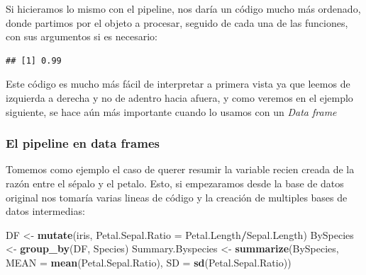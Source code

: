 \documentclass[]{book}
\newenvironment{Shaded}{\begin{snugshade}}{\end{snugshade}}
\newcommand{\DataTypeTok}[1]{\textcolor[rgb]{0.13,0.29,0.53}{#1}}
\newcommand{\DecValTok}[1]{\textcolor[rgb]{0.00,0.00,0.81}{#1}}
\newcommand{\KeywordTok}[1]{\textcolor[rgb]{0.13,0.29,0.53}{\textbf{#1}}}
\newcommand{\NormalTok}[1]{#1}
\newcommand{\OperatorTok}[1]{\textcolor[rgb]{0.81,0.36,0.00}{\textbf{#1}}}
\newcommand{\StringTok}[1]{\textcolor[rgb]{0.31,0.60,0.02}{#1}}
\begin{document}
Si hicieramos lo mismo con el pipeline, nos daría un código mucho más
ordenado, donde partimos por el objeto a procesar, seguido de cada una
de las funciones, con sus argumentos si es necesario:

\begin{Shaded}
\end{Shaded}

\begin{verbatim}
## [1] 0.99
\end{verbatim}

Este código es mucho más fácil de interpretar a primera vista ya que
leemos de izquierda a derecha y no de adentro hacia afuera, y como
veremos en el ejemplo siguiente, se hace aún más importante cuando lo
usamos con un \emph{Data frame}

\hypertarget{el-pipeline-en-data-frames}{%
\subsubsection{El pipeline en data
frames}\label{el-pipeline-en-data-frames}}

Tomemos como ejemplo el caso de querer resumir la variable recien creada
de la razón entre el sépalo y el petalo. Esto, si empezaramos desde la
base de datos original nos tomaría varias lineas de código y la creación
de multiples bases de datos intermedias:

\begin{Shaded}
\begin{Highlighting}[]
\NormalTok{DF <-}\StringTok{ }\KeywordTok{mutate}\NormalTok{(iris, }\DataTypeTok{Petal.Sepal.Ratio =}\NormalTok{ Petal.Length}\OperatorTok{/}\NormalTok{Sepal.Length)}
\NormalTok{BySpecies <-}\StringTok{ }\KeywordTok{group_by}\NormalTok{(DF, Species)}
\NormalTok{Summary.Byspecies <-}\StringTok{ }\KeywordTok{summarize}\NormalTok{(BySpecies, }\DataTypeTok{MEAN =} \KeywordTok{mean}\NormalTok{(Petal.Sepal.Ratio), }
    \DataTypeTok{SD =} \KeywordTok{sd}\NormalTok{(Petal.Sepal.Ratio))}
\end{Highlighting}
\end{Shaded}
\end{document}
